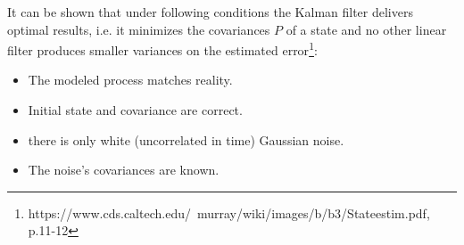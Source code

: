 It can be shown that under following conditions the Kalman filter delivers optimal results, i.e. it minimizes the covariances $P$ of a state and no other linear filter produces smaller variances on the estimated error\footnote{https://www.cds.caltech.edu/~murray/wiki/images/b/b3/Stateestim.pdf, p.11-12}:

\begin{itemize}
\item The modeled process matches reality.
\item Initial state and covariance are correct.
\item there is only white (uncorrelated in time) Gaussian noise.
\item The noise's covariances are known.
\end{itemize}


